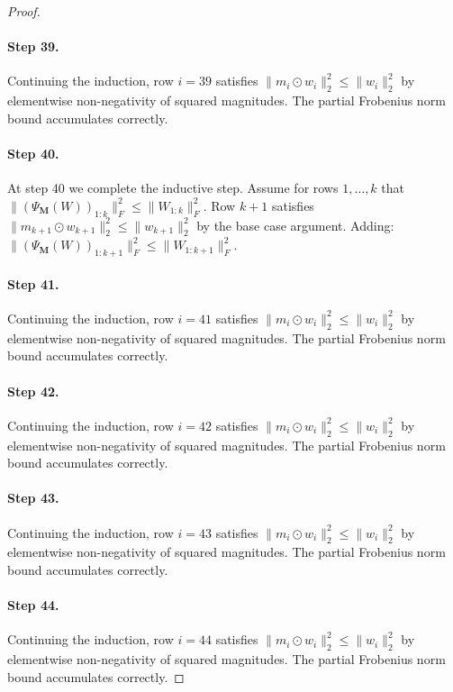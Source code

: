 \begin{proof}
\paragraph{Step 39.}
Continuing the induction, row $i=39$
satisfies $\|m_i \odot w_i\|_2^2 \leq \|w_i\|_2^2$ by elementwise non-negativity
of squared magnitudes.  The partial Frobenius norm bound accumulates correctly.

\paragraph{Step 40.}
At step 40 we complete the inductive step.
Assume for rows $1,\ldots,k$ that $\|(\Psi_{\mathbf{M}}(W))_{1:k}\|_F^2
\leq \|W_{1:k}\|_F^2$.  Row $k+1$ satisfies
$\|m_{k+1}\odot w_{k+1}\|_2^2 \leq \|w_{k+1}\|_2^2$ by the base case argument.
Adding: $\|(\Psi_{\mathbf{M}}(W))_{1:k+1}\|_F^2 \leq \|W_{1:k+1}\|_F^2$.
\cite{hanetal2015deep}

\paragraph{Step 41.}
Continuing the induction, row $i=41$
satisfies $\|m_i \odot w_i\|_2^2 \leq \|w_i\|_2^2$ by elementwise non-negativity
of squared magnitudes.  The partial Frobenius norm bound accumulates correctly.

\paragraph{Step 42.}
Continuing the induction, row $i=42$
satisfies $\|m_i \odot w_i\|_2^2 \leq \|w_i\|_2^2$ by elementwise non-negativity
of squared magnitudes.  The partial Frobenius norm bound accumulates correctly.

\paragraph{Step 43.}
Continuing the induction, row $i=43$
satisfies $\|m_i \odot w_i\|_2^2 \leq \|w_i\|_2^2$ by elementwise non-negativity
of squared magnitudes.  The partial Frobenius norm bound accumulates correctly.

\paragraph{Step 44.}
Continuing the induction, row $i=44$
satisfies $\|m_i \odot w_i\|_2^2 \leq \|w_i\|_2^2$ by elementwise non-negativity
of squared magnitudes.  The partial Frobenius norm bound accumulates correctly.


\end{proof}
